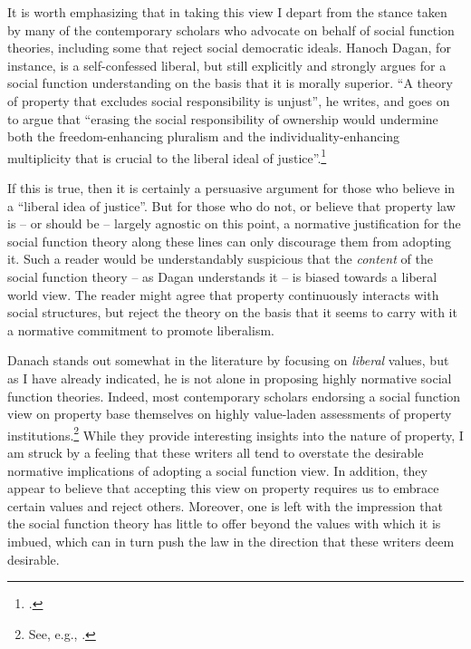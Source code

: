 \documentclass[12pt,a4paper]{book} %
\begin{document}
It is worth emphasizing that in taking this view I depart from the stance taken by many of the contemporary scholars who advocate on behalf of social function theories, including some that reject social democratic ideals. Hanoch Dagan, for instance, is a self-confessed liberal, but still explicitly and strongly argues for a social function understanding on the basis that it is morally superior. ``A theory of property that excludes social responsibility is unjust'', he writes, and goes on to argue that ``erasing the social responsibility of ownership would undermine both the freedom-enhancing pluralism and the individuality-enhancing multiplicity that is crucial to the liberal ideal of justice''.\footcite[1259]{dagan07}

If this is true, then it is certainly a persuasive argument for those who believe in a ``liberal idea of justice''. But for those who do not, or believe that property law is -- or should be -- largely agnostic on this point, a normative justification for the social function theory along these lines can only discourage them from adopting it. Such a reader would be understandably suspicious that the {\it content} of the social function theory -- as Dagan understands it -- is biased towards a liberal world view. The reader might agree that property continuously interacts with social structures, but reject the theory on the basis that it seems to carry with it a normative commitment to promote liberalism.

Danach stands out somewhat in the literature by focusing on {\it liberal} values, but as I have already indicated, he is not alone in proposing highly normative social function theories. Indeed, most contemporary scholars endorsing a social function view on property base themselves on highly value-laden assessments of property institutions.\footnote{See, e.g.,  \cite{alexander09,crawford11,davidson11,singer09,penalver09}.} While they provide interesting insights into the nature of property, I am struck by a feeling that these writers all tend to overstate the desirable normative implications of adopting a social function view. In addition, they appear to believe that accepting this view on property requires us to embrace certain values and reject others. Moreover, one is left with the impression that the social function theory has little to offer beyond the values with which it is imbued, which can in turn push the law in the direction that these writers deem desirable. 
\end{document}
